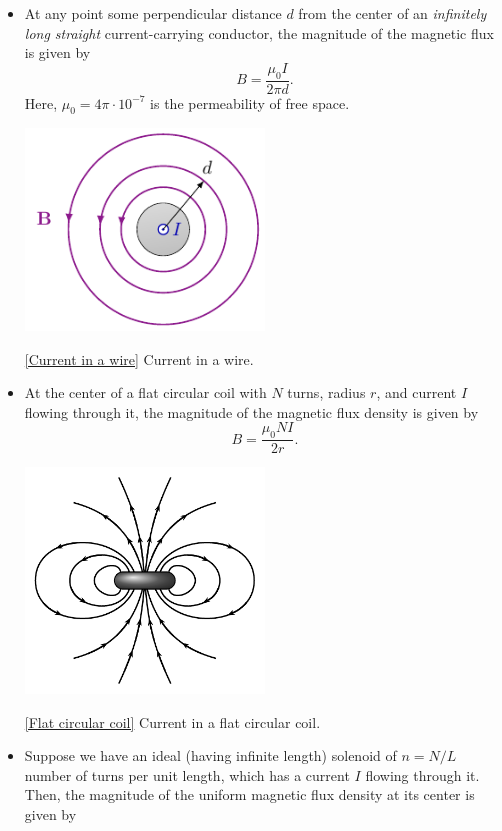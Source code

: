 \documentclass[oneside]{book}
\begin{document}
\begin{itemize}
\begin{center}
        \captionsetup{type=figure}
        \caption[figure]{\ref{Left and right hand rules} Left and right hand rules.}
    \end{center}
    \item At any point some perpendicular distance \(d\) from the center of an \emph{infinitely long straight} current-carrying conductor, the magnitude of the magnetic flux is given by
    \[B=\frac{\mu_0I}{2\pi d}.\]
    Here, \(\mu_0=4\pi\cdot 10^{-7}\) is the permeability of free space.
    \begin{center}
        \includegraphics[width=0.5\textwidth]{../images/Current-Carrying-Wire/Current-Carrying-Wire.pdf}
        \captionsetup{type=figure}
        \caption[figure]{\ref{Current in a wire} Current in a wire.}
    \end{center}
    \item At the center of a flat circular coil with \(N\) turns, radius \(r\), and current \(I\) flowing through it, the magnitude of the magnetic flux density is given by 
    \[B=\frac{\mu_0NI}{2r}.\]
    \begin{center}
        \includegraphics[width=0.5\textwidth]{../images/Flat-Circular-Coil/Flat-Circular-Coil.pdf}        \captionsetup{type=figure}
        \caption[figure]{\ref{Flat circular coil} Current in a flat circular coil.}
    \end{center}
    \item Suppose we have an ideal (having infinite length) solenoid of \(n=N/L\) number of turns per unit length, which has a current \(I\) flowing through it. Then, the magnitude of the uniform magnetic flux density at its center is given by 

\end{itemize}
\end{document}
